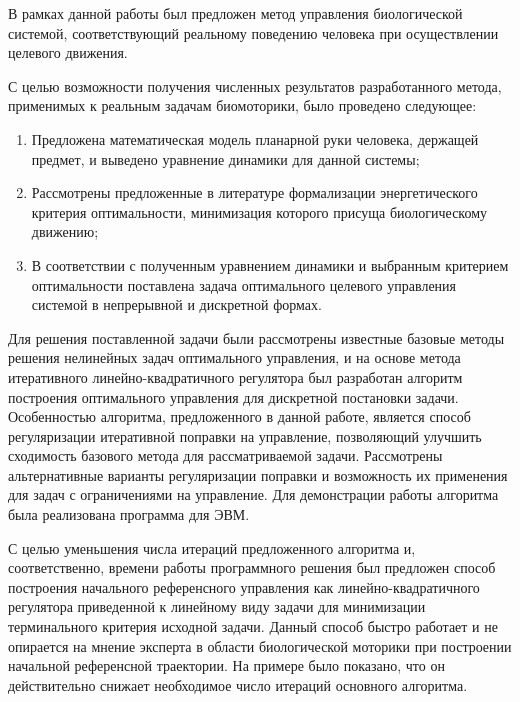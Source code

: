 \documentclass[../doc.tex]{subfiles}
\begin{document}
    В рамках данной работы был предложен метод управления биологической системой,
    соответствующий реальному поведению человека при осуществлении целевого движения.

    С целью возможности получения численных результатов разработанного метода,
        применимых к реальным задачам биомоторики, было проведено следующее:
    \begin{enumerate}\itemsep0em
        \item Предложена математическая модель планарной руки человека, держащей предмет,
            и выведено уравнение динамики для данной системы;
        \item Рассмотрены предложенные в литературе формализации энергетического критерия оптимальности, минимизация которого присуща биологическому движению;
        \item В соответствии с полученным уравнением динамики и выбранным критерием оптимальности поставлена задача оптимального целевого управления системой в непрерывной и дискретной формах.
    \end{enumerate}
    
    Для решения поставленной задачи были рассмотрены известные базовые методы решения нелинейных
        задач оптимального управления, и на основе метода итеративного линейно-квадратичного регулятора
        был разработан алгоритм построения оптимального управления для дискретной постановки задачи.
    Особенностью алгоритма, предложенного в данной работе, является способ регуляризации итеративной поправки на управление,
        позволяющий улучшить сходимость базового метода для рассматриваемой задачи.
    Рассмотрены альтернативные варианты регуляризации поправки и возможность их применения для задач
        с ограничениями на управление.
    Для демонстрации работы алгоритма была реализована программа для ЭВМ.

    С целью уменьшения числа итераций предложенного алгоритма и, соответственно, времени работы
        программного решения был предложен способ построения начального референсного управления как
        линейно-квадратичного регулятора приведенной к линейному виду задачи для минимизации терминального
        критерия исходной задачи.
    Данный способ быстро работает и не опирается на мнение эксперта в области биологической моторики при построении начальной референсной траектории.
    На примере было показано, что он действительно снижает необходимое число итераций основного алгоритма.
    
\end{document}
